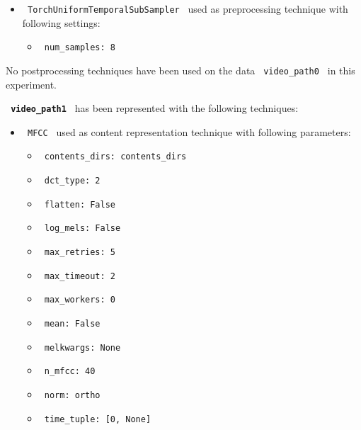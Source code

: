 \documentclass[11pt]{article}
\begin{document}
\begin{itemize}
    \item
     \verb| TorchUniformTemporalSubSampler | used as preprocessing technique with following settings:
     \begin{itemize}
             \item
            \verb| num_samples: 8|
           \end{itemize}
\end{itemize}
\hfill\break
\hfill\break



No postprocessing techniques have been used on the data \lstinline[style=verbatim-text]| video_path0 | in this experiment.
\hfill\break
\hfill\break



\textbf{\lstinline[style=verbatim-text]| video_path1 |} has been represented with the following techniques:
\hfill\break
\hfill\break

\begin{itemize}
                                                            
            \item
        \verb| MFCC | used as content representation technique with following parameters:
        \begin{itemize}
                            \item
                \verb| contents_dirs: contents_dirs|
                            \item
                \verb| dct_type: 2|
                            \item
                \verb| flatten: False|
                            \item
                \verb| log_mels: False|
                            \item
                \verb| max_retries: 5|
                            \item
                \verb| max_timeout: 2|
                            \item
                \verb| max_workers: 0|
                            \item
                \verb| mean: False|
                            \item
                \verb| melkwargs: None|
                            \item
                \verb| n_mfcc: 40|
                            \item
                \verb| norm: ortho|
                            \item
                \verb| time_tuple: [0, None]|
                    \end{itemize}
    \end{itemize}
\hfill\break
\hfill\break
\end{document}
